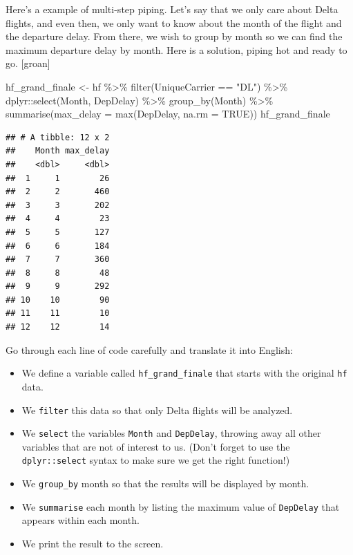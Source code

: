 \documentclass[
]{book}
\newenvironment{Shaded}{\begin{snugshade}}{\end{snugshade}}
\newcommand{\AttributeTok}[1]{\textcolor[rgb]{0.77,0.63,0.00}{#1}}
\newcommand{\ConstantTok}[1]{\textcolor[rgb]{0.00,0.00,0.00}{#1}}
\newcommand{\FunctionTok}[1]{\textcolor[rgb]{0.00,0.00,0.00}{#1}}
\newcommand{\NormalTok}[1]{#1}
\newcommand{\OtherTok}[1]{\textcolor[rgb]{0.56,0.35,0.01}{#1}}
\newcommand{\SpecialCharTok}[1]{\textcolor[rgb]{0.00,0.00,0.00}{#1}}
\newcommand{\StringTok}[1]{\textcolor[rgb]{0.31,0.60,0.02}{#1}}
\providecommand{\tightlist}{%
  \setlength{\itemsep}{0pt}\setlength{\parskip}{0pt}}
\begin{document}
Here's a example of multi-step piping. Let's say that we only care about Delta flights, and even then, we only want to know about the month of the flight and the departure delay. From there, we wish to group by month so we can find the maximum departure delay by month. Here is a solution, piping hot and ready to go. {[}groan{]}

\begin{Shaded}
\begin{Highlighting}[]
\NormalTok{hf\_grand\_finale }\OtherTok{\textless{}{-}}\NormalTok{ hf }\SpecialCharTok{\%\textgreater{}\%}
    \FunctionTok{filter}\NormalTok{(UniqueCarrier }\SpecialCharTok{==} \StringTok{"DL"}\NormalTok{) }\SpecialCharTok{\%\textgreater{}\%}
\NormalTok{    dplyr}\SpecialCharTok{::}\FunctionTok{select}\NormalTok{(Month, DepDelay) }\SpecialCharTok{\%\textgreater{}\%}
    \FunctionTok{group\_by}\NormalTok{(Month) }\SpecialCharTok{\%\textgreater{}\%}
    \FunctionTok{summarise}\NormalTok{(}\AttributeTok{max\_delay =} \FunctionTok{max}\NormalTok{(DepDelay, }\AttributeTok{na.rm =} \ConstantTok{TRUE}\NormalTok{))}
\NormalTok{hf\_grand\_finale}
\end{Highlighting}
\end{Shaded}

\begin{verbatim}
## # A tibble: 12 x 2
##    Month max_delay
##    <dbl>     <dbl>
##  1     1        26
##  2     2       460
##  3     3       202
##  4     4        23
##  5     5       127
##  6     6       184
##  7     7       360
##  8     8        48
##  9     9       292
## 10    10        90
## 11    11        10
## 12    12        14
\end{verbatim}

Go through each line of code carefully and translate it into English:

\begin{itemize}
\tightlist
\item
  We define a variable called \texttt{hf\_grand\_finale} that starts with the original \texttt{hf} data.
\item
  We \texttt{filter} this data so that only Delta flights will be analyzed.
\item
  We \texttt{select} the variables \texttt{Month} and \texttt{DepDelay}, throwing away all other variables that are not of interest to us. (Don't forget to use the \texttt{dplyr::select} syntax to make sure we get the right function!)
\item
  We \texttt{group\_by} month so that the results will be displayed by month.
\item
  We \texttt{summarise} each month by listing the maximum value of \texttt{DepDelay} that appears within each month.
\item
  We print the result to the screen.
\end{itemize}
\end{document}
